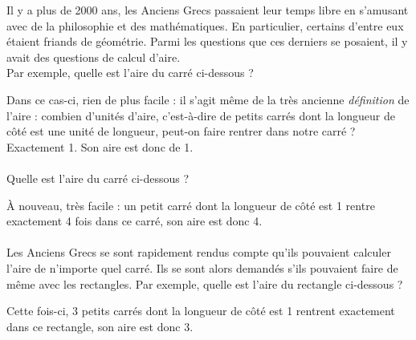 \documentclass[a4paper,fontsize=13pt]{scrreprt}
\theoremstyle{plain}
\theoremstyle{definition}
\newcommand {\axes} {
	\draw[thick, ->] (\xmin,0) -- (\xmax+1,0);
	\draw[thick, ->] (0,\ymin) -- (0,\ymax+1);
	\draw (0,\ymax+0.5) node [left] {$y$};
	\draw (\xmax+0.5, 0) node [below] {$x$};
	\draw[thick] (-0.15,1)--(0.15,1) (1,-0.15)--(1,0.15);
	\draw (0,1)node[left]{$1$} (1,0)node[below]{$1$};
}
\begin{document}
Il y a plus de 2000 ans, les Anciens Grecs passaient leur temps libre en s'amusant avec de la philosophie et des mathématiques. En particulier, certains d'entre eux étaient friands de géométrie. Parmi les questions que ces derniers se posaient, il y avait des questions de calcul d'aire. \\
Par exemple, quelle est l'aire du carré ci-dessous ?
\begin{center}
\end{center}
Dans ce cas-ci, rien de plus facile : il s'agit même de la très ancienne \textit{définition} de l'aire : combien d'unités d'aire, c'est-à-dire de petits carrés dont la longueur de côté est une unité de longueur, peut-on faire rentrer dans notre carré ? Exactement 1. Son aire est donc de 1. \\
~\\
Quelle est l'aire du carré ci-dessous ?
\begin{center}
\end{center}
À nouveau, très facile : un petit carré dont la longueur de côté est 1 rentre exactement 4 fois dans ce carré, son aire est donc 4. \\
~\\
Les Anciens Grecs se sont rapidement rendus compte qu'ils pouvaient calculer l'aire de n'importe quel carré. Ils se sont alors demandés s'ils pouvaient faire de même avec les rectangles. Par exemple, quelle est l'aire du rectangle ci-dessous ?
\begin{center}
\end{center}
Cette fois-ci, 3 petits carrés dont la longueur de côté est 1 rentrent exactement dans ce rectangle, son aire est donc 3. \\
\end{document}
